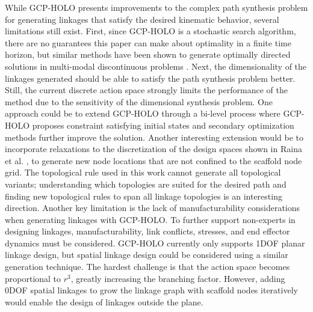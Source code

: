 While GCP-HOLO presents improvements to the complex path synthesis problem for generating linkages that satisfy the desired kinematic behavior, several limitations still exist. First, since GCP-HOLO is a stochastic search algorithm, there are no guarantees this paper can make about optimality in a finite time horizon, but similar methods have been shown to generate optimally directed solutions in multi-modal discontinuous problems \cite{you_graph_2018, zhao_robogrammar_2020}. Next, the dimensionality of the linkages generated should be able to satisfy the path synthesis problem better. Still, the current discrete action space strongly limits the performance of the method due to the sensitivity of the dimensional synthesis problem. One approach could be to extend GCP-HOLO through a bi-level process where GCP-HOLO proposes constraint satisfying initial states and secondary optimization methods further improve the solution. Another interesting extension would be to incorporate relaxations to the discretization of the design spaces shown in Raina et al. \cite{raina_design_2021}, to generate new node locations that are not confined to the scaffold node grid. The topological rule used in this work cannot generate all topological variants; understanding which topologies are suited for the desired path and finding new topological rules to span all linkage topologies is an interesting direction. Another key limitation is the lack of manufacturability considerations when generating linkages with GCP-HOLO. To further support non-experts in designing linkages, manufacturability, link conflicts, stresses, and end effector dynamics must be considered. GCP-HOLO currently only supports 1DOF planar linkage design, but spatial linkage design could be considered using a similar generation technique. The hardest challenge is that the action space becomes proportional to $r^3$, greatly increasing the branching factor. However, adding 0DOF spatial linkages to grow the linkage graph with scaffold nodes iteratively would enable the design of linkages outside the plane.

